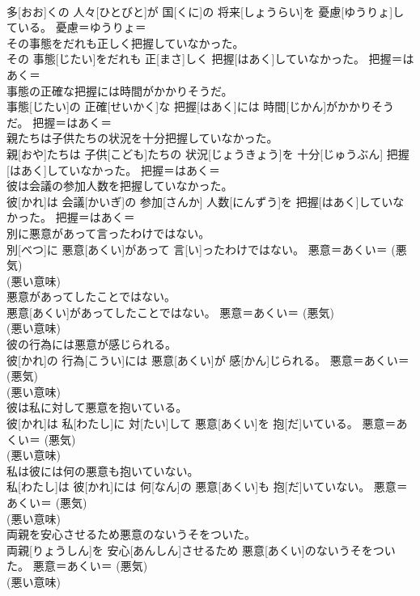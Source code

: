 \documentclass[8pt]{extreport}
\begin{document}
\begin{CJK}{UTF8}{min}
{\\	多[おお]くの 人々[ひとびと]が 国[くに]の 将来[しょうらい]を 憂慮[ゆうりょ]している。	憂慮＝ゆうりょ＝ 
\\	その事態をだれも正しく把握していなかった。	
\\	その 事態[じたい]をだれも 正[まさ]しく 把握[はあく]していなかった。	把握＝はあく＝ 
\\	事態の正確な把握には時間がかかりそうだ。	
\\	事態[じたい]の 正確[せいかく]な 把握[はあく]には 時間[じかん]がかかりそうだ。	把握＝はあく＝ 
\\	親たちは子供たちの状況を十分把握していなかった。	
\\	親[おや]たちは 子供[こども]たちの 状況[じょうきょう]を 十分[じゅうぶん] 把握[はあく]していなかった。	把握＝はあく＝ 
\\	彼は会議の参加人数を把握していなかった。	
\\	彼[かれ]は 会議[かいぎ]の 参加[さんか] 人数[にんずう]を 把握[はあく]していなかった。	把握＝はあく＝ 
\\	別に悪意があって言ったわけではない。	
\\	別[べつ]に 悪意[あくい]があって 言[い]ったわけではない。	悪意＝あくい＝ (悪気) 
\\	(悪い意味) 
\\	悪意があってしたことではない。	
\\	悪意[あくい]があってしたことではない。	悪意＝あくい＝ (悪気) 
\\	(悪い意味) 
\\	彼の行為には悪意が感じられる。	
\\	彼[かれ]の 行為[こうい]には 悪意[あくい]が 感[かん]じられる。	悪意＝あくい＝ (悪気) 
\\	(悪い意味) 
\\	彼は私に対して悪意を抱いている。	
\\	彼[かれ]は 私[わたし]に 対[たい]して 悪意[あくい]を 抱[だ]いている。	悪意＝あくい＝ (悪気) 
\\	(悪い意味) 
\\	私は彼には何の悪意も抱いていない。	
\\	私[わたし]は 彼[かれ]には 何[なん]の 悪意[あくい]も 抱[だ]いていない。	悪意＝あくい＝ (悪気) 
\\	(悪い意味) 
\\	両親を安心させるため悪意のないうそをついた。	
\\	両親[りょうしん]を 安心[あんしん]させるため 悪意[あくい]のないうそをついた。	悪意＝あくい＝ (悪気) 
\\	(悪い意味) 
}
\end{CJK}
\end{document}
